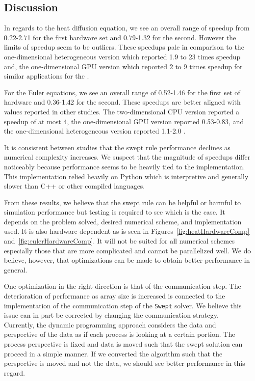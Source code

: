 \documentclass[journal,article,submit,moreauthors,pdftex]{Definitions/mdpi}
\def\Swept{\texttt{Swept}}
\begin{document}
\begin{paracol}{2}
\linenumbers
\switchcolumn

\section{Discussion}
\label{discussion-section}
In regards to the heat diffusion equation, we see an overall range of speedup from 0.22-2.71 for the first hardware set and 0.79-1.32 for the second. However the limits of speedup seem to be outliers. These speedups pale in comparison to the one-dimensional heterogeneous version which reported 1.9 to 23 times speedup and, the one-dimensional GPU version which reported 2 to 9 times speedup for similar applications for the  \cite{Magee2018AcceleratingDecomposition,Magee2020ApplyingSystems}. 

For the Euler equations, we see an overall range of 0.52-1.46 for the first set of hardware and 0.36-1.42 for the second. These speedups are better aligned with values reported in other studies. The two-dimensional CPU version reported a speedup of at most 4, the one-dimensional GPU version reported 0.53-0.83, and the one-dimensional heterogeneous version reported 1.1-2.0 \cite{Alhubail2018ThePDEs,Magee2018AcceleratingDecomposition,Magee2020ApplyingSystems}.

It is consistent between studies that the swept rule performance declines as numerical complexity increases. We suspect that the magnitude of speedups differ noticeably because performance seems to be heavily tied to the implementation. This implementation relied heavily on Python which is interpretive and generally slower than C++ or other compiled languages.  

From these results, we believe that the swept rule can be helpful or harmful to simulation performance but testing is required to see which is the case. It depends on the problem solved, desired numerical scheme, and implementation used. It is also hardware dependent as is seen in Figures~\ref{fig:heatHardwareComp} and~\ref{fig:eulerHardwareComp}. It will not be suited for all numerical schemes especially those that are more complicated and cannot be parallelized well. We do believe, however, that optimizations can be made to obtain better performance in general. 

One optimization in the right direction is that of the communication step. The deterioration of performance as array size is increased is connected to the implementation of the communication step of the \Swept{} solver. We believe this issue can in part be corrected by changing the communication strategy. Currently, the dynamic programming approach considers the data and perspective of the data as if each process is looking at a certain portion. The process perspective is fixed and data is moved such that the swept solution can proceed in a simple manner. If we converted the algorithm such that the perspective is moved and not the data, we should see better performance in this regard.


\end{paracol}
\end{document}
